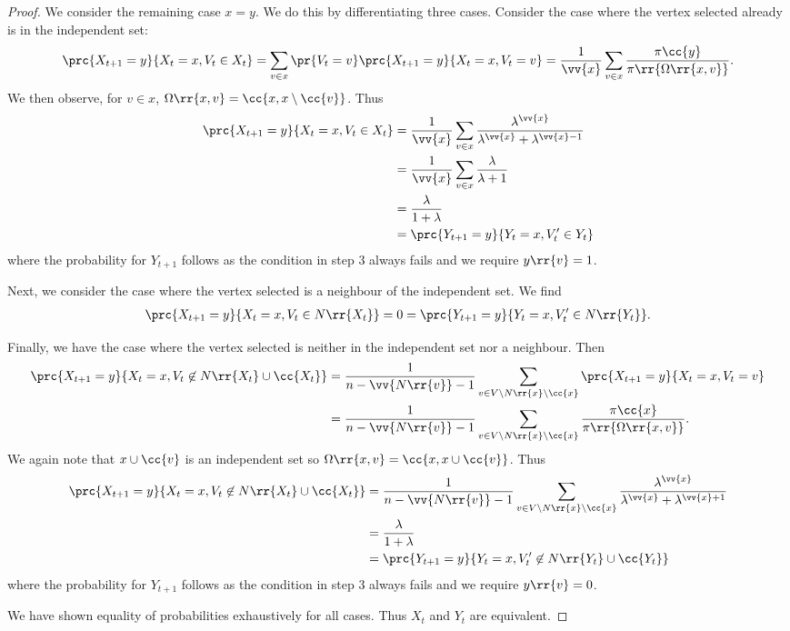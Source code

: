 \documentclass{article}
\begin{document}
\begin{claim*}[1]
\begin{proof}
    We consider the remaining case $x=y$. We do this by differentiating three cases.
    Consider the case where the vertex selected already is in the independent set:
    \begin{align*}
      \prc{X_{t+1}=y}{X_t=x, V_t\in X_t}
      = \sum_{v\in x} \pr{V_t=v} \prc{X_{t+1}=y}{X_t=x, V_t=v}
      = \frac{1}{\vv{x}}\sum_{v\in x} \frac{\pi\cc{y}}{\pi\rr{\Omega\rr{x,v}}}.
    \end{align*}
    We then observe, for $v\in x$, $\Omega\rr{x,v}=\cc{x,x\setminus\cc{v}}$. Thus
    \begin{align*}
      \prc{X_{t+1}=y}{X_t=x, V_t\in X_t} &= \frac{1}{\vv{x}}\sum_{v\in x} \frac{\lambda^{\vv{x}}}{\lambda^{\vv{x}}+\lambda^{\vv{x}-1}} \\
                                         &= \frac{1}{\vv{x}}\sum_{v\in x} \frac{\lambda}{\lambda+1} \\
                                         &= \frac{\lambda}{1+\lambda}  \\
                                         &= \prc{Y_{t+1}=y}{Y_t=x, V'_t\in Y_t}
    \end{align*}
    where the probability for $Y_{t+1}$ follows as the condition in step 3 always fails and we require $y\rr{v}=1$.

    Next, we consider the case where the vertex selected is a neighbour of the independent set.
    We find
    \begin{align*}
      \prc{X_{t+1}=y}{X_t=x, V_t\in N\rr{X_t}} = 0 = \prc{Y_{t+1}=y}{Y_t=x, V'_t\in N\rr{Y_t}}.
    \end{align*}

    Finally, we have the case where the vertex selected is neither in the independent set
    nor a neighbour. Then
    \begin{align*}
      \prc{X_{t+1}=y}{X_t=x, V_t\not\in N\rr{X_t}\cup \cc{X_t}}
      &= \frac{1}{n-\vv{N\rr{v}}-1}\sum_{v\in V\setminus N\rr{x}\setminus\cc{x}} \prc{X_{t+1}=y}{X_t=x, V_t=v} \\
      &= \frac{1}{n-\vv{N\rr{v}}-1}\sum_{v\in V\setminus N\rr{x}\setminus\cc{x}} \frac{\pi\cc{x}}{\pi\rr{\Omega\rr{x,v}}}.
    \end{align*}
    We again note that $x\cup\cc{v}$ is an independent set so $\Omega\rr{x,v}=\cc{x,x\cup\cc{v}}$. Thus
    \begin{align*}
      \prc{X_{t+1}=y}{X_t=x, V_t\not\in N\rr{X_t}\cup \cc{X_t}}
      &= \frac{1}{n-\vv{N\rr{v}}-1}\sum_{v\in V\setminus N\rr{x}\setminus\cc{x}} \frac{\lambda^{\vv{x}}}{\lambda^{\vv{x}}+\lambda^{\vv{x}+1}} \\
      &= \frac{\lambda}{1+\lambda} \\
      &= \prc{Y_{t+1}=y}{Y_t=x, V'_t\not\in N\rr{Y_t}\cup \cc{Y_t}}
    \end{align*}
    where the probability for $Y_{t+1}$ follows as the condition in step 3 always fails and we require $y\rr{v}=0$.

    We have shown equality of probabilities exhaustively for all cases. Thus $X_t$ and $Y_t$ are
    equivalent.
  \end{proof}
\end{claim*}
\end{document}
